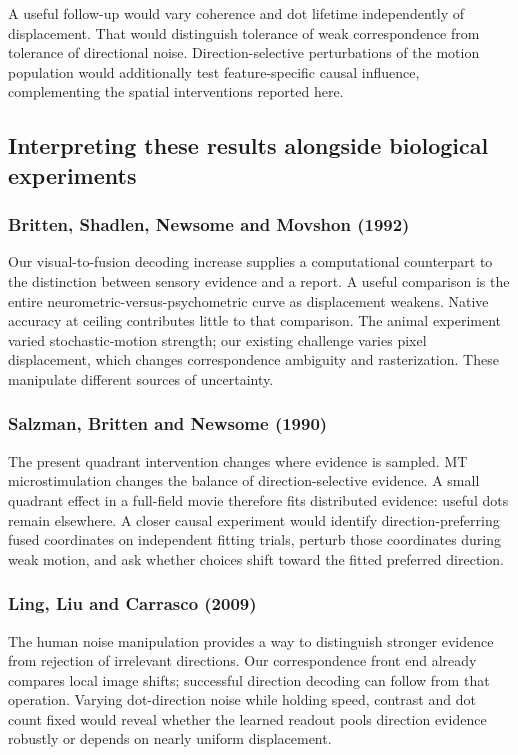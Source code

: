 \documentclass[11pt]{article}
\begin{document}
A useful follow-up would vary coherence and dot lifetime independently of displacement. That would distinguish tolerance of weak correspondence from tolerance of directional noise. Direction-selective perturbations of the motion population would additionally test feature-specific causal influence, complementing the spatial interventions reported here.

\subsection{Interpreting these results alongside biological experiments}
\subsubsection{Britten, Shadlen, Newsome and Movshon (1992)}
Our visual-to-fusion decoding increase supplies a computational counterpart to the distinction between sensory evidence and a report. A useful comparison is the entire neurometric-versus-psychometric curve as displacement weakens. Native accuracy at ceiling contributes little to that comparison. The animal experiment varied stochastic-motion strength; our existing challenge varies pixel displacement, which changes correspondence ambiguity and rasterization. These manipulate different sources of uncertainty. \cite{bio_britten}

\subsubsection{Salzman, Britten and Newsome (1990)}
The present quadrant intervention changes where evidence is sampled. MT microstimulation changes the balance of direction-selective evidence. A small quadrant effect in a full-field movie therefore fits distributed evidence: useful dots remain elsewhere. A closer causal experiment would identify direction-preferring fused coordinates on independent fitting trials, perturb those coordinates during weak motion, and ask whether choices shift toward the fitted preferred direction. \cite{bio_salzman}

\subsubsection{Ling, Liu and Carrasco (2009)}
The human noise manipulation provides a way to distinguish stronger evidence from rejection of irrelevant directions. Our correspondence front end already compares local image shifts; successful direction decoding can follow from that operation. Varying dot-direction noise while holding speed, contrast and dot count fixed would reveal whether the learned readout pools direction evidence robustly or depends on nearly uniform displacement. \cite{bio_ling}
\end{document}

